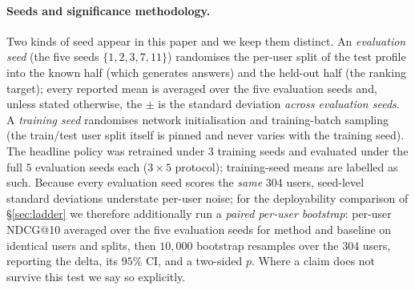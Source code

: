 \documentclass[11pt]{article}
\begin{document}
\paragraph{Seeds and significance methodology.} Two kinds of seed appear in this paper and we keep them distinct.
An \emph{evaluation seed} (the five seeds $\{1,2,3,7,11\}$) randomises the per-user split of the test profile into the
known half (which generates answers) and the held-out half (the ranking target); every reported mean is averaged over
the five evaluation seeds and, unless stated otherwise, the $\pm$ is the standard deviation \emph{across evaluation
seeds}. A \emph{training seed} randomises network initialisation and training-batch sampling (the train/test user split
itself is pinned and never varies with the training seed). The headline policy was retrained under $3$ training seeds
and evaluated under the full $5$ evaluation seeds each ($3\times5$ protocol); training-seed means are labelled as such.
Because every evaluation seed scores the \emph{same} $304$ users, seed-level standard deviations understate per-user
noise; for the deployability comparison of \S\ref{sec:ladder} we therefore additionally run a \emph{paired per-user
bootstrap}: per-user NDCG@10 averaged over the five evaluation seeds for method and baseline on identical users and
splits, then $10{,}000$ bootstrap resamples over the $304$ users, reporting the delta, its $95\%$ CI, and a two-sided
$p$. Where a claim does not survive this test we say so explicitly.
\end{document}
